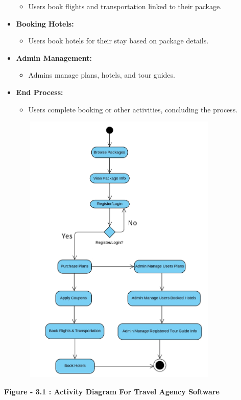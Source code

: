 \documentclass{scrreprt}
\begin{document}
\begin{itemize}
    \begin{itemize}
        \item Users book flights and transportation linked to their package.
    \end{itemize}
    \item \textbf{Booking Hotels:}
    \begin{itemize}
        \item Users book hotels for their stay based on package details.
    \end{itemize}
    \item \textbf{Admin Management:}
    \begin{itemize}
        \item Admins manage plans, hotels, and tour guides.
    \end{itemize}
    \item \textbf{End Process:}
    \begin{itemize}
        \item Users complete booking or other activities, concluding the process.
    \end{itemize}
\end{itemize}
{\includegraphics[width=450px, height=500px]{actd.jpg}}

\begin{center}
    \parbox{0.8\textwidth}{ 
        \centering
        \textbf{Figure - 3.1 : Activity Diagram For Travel Agency Software}
    }
\end{center}
\end{document}
